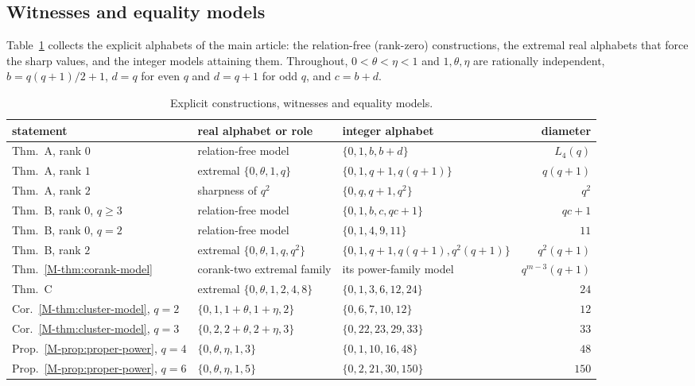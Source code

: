 \documentclass[11pt,reqno]{amsart}
\theoremstyle{plain}
\theoremstyle{definition}
\theoremstyle{plain}
\theoremstyle{plain}
\theoremstyle{plain}
\theoremstyle{plain}
\theoremstyle{plain}
\theoremstyle{plain}
\theoremstyle{definition}
\theoremstyle{definition}
\theoremstyle{definition}
\theoremstyle{plain}
\begin{document}
\subsection{Witnesses and equality models}
Table~\ref{S-tab:witnesses} collects the explicit alphabets of the main
article: the relation-free (rank-zero) constructions, the extremal real
alphabets that force the sharp values, and the integer models attaining
them. Throughout, $0<\theta<\eta<1$ and $1,\theta,\eta$ are rationally
independent, $b=q(q+1)/2+1$, $d=q$ for even $q$ and $d=q+1$ for odd $q$,
and $c=b+d$.

\begin{table}[htbp]
\caption{Explicit constructions, witnesses and equality models.}
\label{S-tab:witnesses}
\begin{center}\small
\begin{tabular}{@{}lllr@{}}
\toprule
statement & real alphabet or role & integer alphabet & diameter\\
\midrule
Thm.~A, rank $0$ & relation-free model & $\{0,1,b,b+d\}$ & $L_4(q)$\\
Thm.~A, rank $1$ & extremal $\{0,\theta,1,q\}$ & $\{0,1,q+1,q(q+1)\}$ & $q(q+1)$\\
Thm.~A, rank $2$ & sharpness of $q^2$ & $\{0,q,q+1,q^2\}$ & $q^2$\\
Thm.~B, rank $0$, $q\ge3$ & relation-free model & $\{0,1,b,c,qc+1\}$ & $qc+1$\\
Thm.~B, rank $0$, $q=2$ & relation-free model & $\{0,1,4,9,11\}$ & $11$\\
Thm.~B, rank $2$ & extremal $\{0,\theta,1,q,q^2\}$ & $\{0,1,q+1,q(q+1),q^2(q+1)\}$ & $q^2(q+1)$\\
Thm.~\ref{M-thm:corank-model} & corank-two extremal family & its power-family model & $q^{m-3}(q+1)$\\
Thm.~C & extremal $\{0,\theta,1,2,4,8\}$ & $\{0,1,3,6,12,24\}$ & $24$\\
Cor.~\ref{M-thm:cluster-model}, $q=2$ & $\{0,1,1+\theta,1+\eta,2\}$ & $\{0,6,7,10,12\}$ & $12$\\
Cor.~\ref{M-thm:cluster-model}, $q=3$ & $\{0,2,2+\theta,2+\eta,3\}$ & $\{0,22,23,29,33\}$ & $33$\\
Prop.~\ref{M-prop:proper-power}, $q=4$ & $\{0,\theta,\eta,1,3\}$ & $\{0,1,10,16,48\}$ & $48$\\
Prop.~\ref{M-prop:proper-power}, $q=6$ & $\{0,\theta,\eta,1,5\}$ & $\{0,2,21,30,150\}$ & $150$\\
\bottomrule
\end{tabular}
\end{center}
\end{table}
\end{document}
